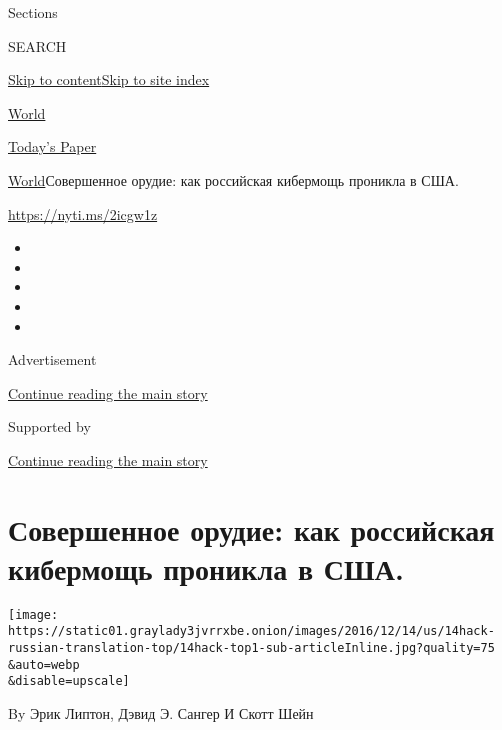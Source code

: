 Sections

SEARCH

\protect\hyperlink{site-content}{Skip to
content}\protect\hyperlink{site-index}{Skip to site index}

\href{https://www.nytimes3xbfgragh.onion/section/world}{World}

\href{https://myaccount.nytimes3xbfgragh.onion/auth/login?response_type=cookie\&client_id=vi}{}

\href{https://www.nytimes3xbfgragh.onion/section/todayspaper}{Today's
Paper}

\href{/section/world}{World}\textbar{}Совершенное орудие: как российская
кибермощь проникла в США.

\url{https://nyti.ms/2icgw1z}

\begin{itemize}
\item
\item
\item
\item
\item
\end{itemize}

Advertisement

\protect\hyperlink{after-top}{Continue reading the main story}

Supported by

\protect\hyperlink{after-sponsor}{Continue reading the main story}

\hypertarget{ux441ux43eux432ux435ux440ux448ux435ux43dux43dux43eux435-ux43eux440ux443ux434ux438ux435-ux43aux430ux43a-ux440ux43eux441ux441ux438ux439ux441ux43aux430ux44f-ux43aux438ux431ux435ux440ux43cux43eux449ux44c-ux43fux440ux43eux43dux438ux43aux43bux430-ux432-ux441ux448ux430}{%
\section{Совершенное орудие: как российская кибермощь проникла в
США.}\label{ux441ux43eux432ux435ux440ux448ux435ux43dux43dux43eux435-ux43eux440ux443ux434ux438ux435-ux43aux430ux43a-ux440ux43eux441ux441ux438ux439ux441ux43aux430ux44f-ux43aux438ux431ux435ux440ux43cux43eux449ux44c-ux43fux440ux43eux43dux438ux43aux43bux430-ux432-ux441ux448ux430}}

\texttt{[image: https://static01.graylady3jvrrxbe.onion/images/2016/12/14/us/14hack-russian-translation-top/14hack-top1-sub-articleInline.jpg?quality=75\\\&auto=webp\\\&disable=upscale]}

By Эрик Липтон, Дэвид Э. Сангер И Скотт Шейн

